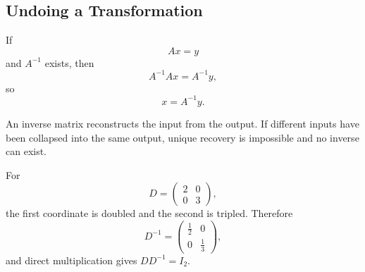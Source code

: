 \subsection{Undoing a Transformation}

If
\[
Ax=y
\]
and $A^{-1}$ exists, then
\[
A^{-1}Ax=A^{-1}y,
\]
so
\[
\boxed{x=A^{-1}y}.
\]

\begin{interpretationbox}
An inverse matrix reconstructs the input from the output. If different inputs have been collapsed into the same output, unique recovery is impossible and no inverse can exist.
\end{interpretationbox}

\begin{examplebox}
For
\[
D=\begin{pmatrix}2&0\\0&3\end{pmatrix},
\]
the first coordinate is doubled and the second is tripled. Therefore
\[
D^{-1}=\begin{pmatrix}\frac12&0\\0&\frac13\end{pmatrix},
\]
and direct multiplication gives $DD^{-1}=I_2$.
\end{examplebox}
